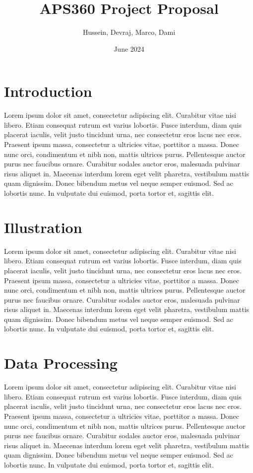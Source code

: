\documentclass{article}
\title{APS360 Project Proposal}
\author{Hussein, Devraj, Marco, Dami}
\date{June 2024}
\begin{document}
\maketitle

\section{Introduction}
Lorem ipsum dolor sit amet, consectetur adipiscing elit. Curabitur vitae nisi libero. Etiam consequat rutrum est varius lobortis. Fusce interdum, diam quis placerat iaculis, velit justo tincidunt urna, nec consectetur eros lacus nec eros. Praesent ipsum massa, consectetur a ultricies vitae, porttitor a massa. Donec nunc orci, condimentum et nibh non, mattis ultrices purus. Pellentesque auctor purus nec faucibus ornare. Curabitur sodales auctor eros, malesuada pulvinar risus aliquet in. Maecenas interdum lorem eget velit pharetra, vestibulum mattis quam dignissim. Donec bibendum metus vel neque semper euismod. Sed ac lobortis nunc. In vulputate dui euismod, porta tortor et, sagittis elit.

\section{Illustration}
Lorem ipsum dolor sit amet, consectetur adipiscing elit. Curabitur vitae nisi libero. Etiam consequat rutrum est varius lobortis. Fusce interdum, diam quis placerat iaculis, velit justo tincidunt urna, nec consectetur eros lacus nec eros. Praesent ipsum massa, consectetur a ultricies vitae, porttitor a massa. Donec nunc orci, condimentum et nibh non, mattis ultrices purus. Pellentesque auctor purus nec faucibus ornare. Curabitur sodales auctor eros, malesuada pulvinar risus aliquet in. Maecenas interdum lorem eget velit pharetra, vestibulum mattis quam dignissim. Donec bibendum metus vel neque semper euismod. Sed ac lobortis nunc. In vulputate dui euismod, porta tortor et, sagittis elit.

\section{Data Processing}
Lorem ipsum dolor sit amet, consectetur adipiscing elit. Curabitur vitae nisi libero. Etiam consequat rutrum est varius lobortis. Fusce interdum, diam quis placerat iaculis, velit justo tincidunt urna, nec consectetur eros lacus nec eros. Praesent ipsum massa, consectetur a ultricies vitae, porttitor a massa. Donec nunc orci, condimentum et nibh non, mattis ultrices purus. Pellentesque auctor purus nec faucibus ornare. Curabitur sodales auctor eros, malesuada pulvinar risus aliquet in. Maecenas interdum lorem eget velit pharetra, vestibulum mattis quam dignissim. Donec bibendum metus vel neque semper euismod. Sed ac lobortis nunc. In vulputate dui euismod, porta tortor et, sagittis elit.
\end{document}
